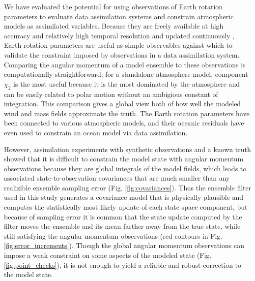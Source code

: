 We have evaluated the potential for using observations of Earth rotation parameters to evaluate data assimilation systems and constrain atmospheric models as assimilated variables.  
%
Because they are freely available at high accuracy and relatively high temporal resolution and updated continuously \citep{iers}, 
Earth rotation parameters are useful as simple observables against which to validate the constraint imposed by observations in a data assimilation system.  
Comparing the angular momentum of a model ensemble to these observations is computationally straightforward;
for a standalone atmosphere model, component $\chi_2$ is the most useful because it is the most dominated by the atmosphere and can be easily related to polar motion without an ambigious constant of integration. 
This comparison gives a global view both of how well the modeled wind and mass fields approximate the truth.
The Earth rotation parameters have been connected to various atmospheric models, and their oceanic residuals have even used to constrain an ocean model via data assimilation. 

However, assimilation experiments with synthetic observations and a known truth showed that it is difficult to constrain the model state with angular momentum observations because they are global integrals of the model fields, which leads to 
associated state-to-observation covariances that are much smaller than any realizible ensemble sampling error (Fig. \ref{fig:covariances}). 
Thus the ensemble filter used in this study generates a covariance model that is physically plausible and computes the statistically most likely update of each state space component, but because of sampling error it is common that 
the state update computed by the filter moves the ensemble and its mean farther away from the true state, while still satisfying the angular momentum observations (red contours in Fig. \ref{fig:error_increments}). 
Though the global angular momentum observations can impose a weak constraint on some aspects of the modeled state (Fig. \ref{fig:point_checks}), it is not enough to yield a reliable and robust correction to the model state. 

